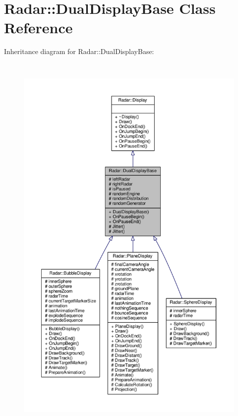 \hypertarget{classRadar_1_1DualDisplayBase}{}\section{Radar\+:\+:Dual\+Display\+Base Class Reference}
\label{classRadar_1_1DualDisplayBase}


Inheritance diagram for Radar\+:\+:Dual\+Display\+Base\+:
\nopagebreak
\begin{figure}[H]
\begin{center}
\leavevmode
\includegraphics[height=550pt]{de/d9d/classRadar_1_1DualDisplayBase__inherit__graph}
\end{center}
\end{figure}


